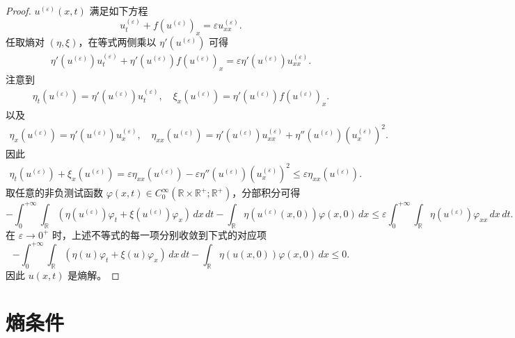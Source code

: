 \begin{proof}
    $u^{(\varepsilon)}(x,t)$ 满足如下方程
    \[
        u^{(\varepsilon)}_t + f(u^{(\varepsilon)})_x = \varepsilon u^{(\varepsilon)}_{xx}.
    \]
    任取熵对 $(\eta,\xi)$，在等式两侧乘以 $\eta'(u^{(\varepsilon)})$ 可得
    \begin{gather*}
        \eta'(u^{(\varepsilon)}) u^{(\varepsilon)}_t + \eta'(u^{(\varepsilon)})f(u^{(\varepsilon)})_x = \varepsilon \eta'(u^{(\varepsilon)}) u^{(\varepsilon)}_{xx}.
    \end{gather*}
    注意到
    \begin{align*}
        \eta_t(u^{(\varepsilon)}) ={} \eta'(u^{(\varepsilon)}) u^{(\varepsilon)}_t, \quad
        \xi_x(u^{(\varepsilon)}) ={} \eta'(u^{(\varepsilon)})f(u^{(\varepsilon)})_x.
    \end{align*}
    以及
    \begin{align*}
        \eta_{x}(u^{(\varepsilon)}) ={} \eta'(u^{(\varepsilon)}) u^{(\varepsilon)}_{x}, \quad
        \eta_{xx}(u^{(\varepsilon)}) ={} \eta'(u^{(\varepsilon)}) u^{(\varepsilon)}_{xx} + \eta''(u^{(\varepsilon)})(u^{(\varepsilon)}_{x})^2.
    \end{align*}
    因此
    \begin{gather*}
        \eta_t(u^{(\varepsilon)}) + \xi_x(u^{(\varepsilon)}) =
        \varepsilon \eta_{xx}(u^{(\varepsilon)})
        - \varepsilon \eta''(u^{(\varepsilon)})(u^{(\varepsilon)}_{x})^2
        \le \varepsilon \eta_{xx}(u^{(\varepsilon)}).
    \end{gather*}
    取任意的非负测试函数 $\varphi(x,t) \in C_0^\infty(\mathbb{R} \times \mathbb{R}^+;\mathbb{R}^+)$，分部积分可得
    \[
        - \int_0^{+\infty} \int_{\mathbb{R}}(\eta(u^{(\varepsilon)}) \varphi_t + \xi(u^{(\varepsilon)}) \varphi_x) \,dx\,dt
        - \int_{\mathbb{R}} \eta(u^{(\varepsilon)}(x,0))\varphi(x,0)\,dx \le \varepsilon \int_0^{+\infty} \int_{\mathbb{R}}
        \eta(u^{(\varepsilon)}) \varphi_{xx}\,dx\,dt.
    \]
    在 $\varepsilon \to 0^+$ 时，上述不等式的每一项分别收敛到下式的对应项
    \[
        - \int_0^{+\infty} \int_{\mathbb{R}}(\eta(u) \varphi_t + \xi(u) \varphi_x) \,dx\,dt
        - \int_{\mathbb{R}} \eta(u(x,0))\varphi(x,0)\,dx \le 0.
    \]
    因此 $u(x,t)$ 是熵解。
\end{proof}


\section{熵条件}

